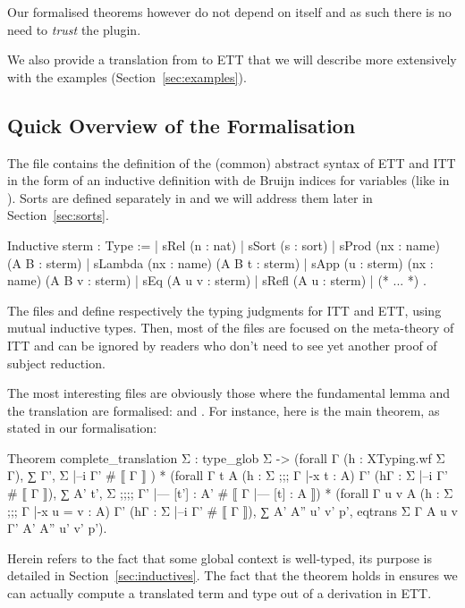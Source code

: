 Our formalised theorems however do not depend on \TemplateCoq itself and as such
there is no need to \emph{trust} the plugin.

We also provide a translation from \TemplateCoq to ETT that we will describe
more extensively with the examples (Section~\ref{sec:examples}).

\subsection{Quick Overview of the Formalisation}

The file  contains the definition of the (common) abstract syntax
of ETT and ITT in the form of an inductive definition with de Bruijn
indices for variables (like in \TemplateCoq).
Sorts are defined separately in  and we will address them later
in Section~\ref{sec:sorts}.

\begin{coq}
Inductive sterm : Type :=
| sRel (n : nat)
| sSort (s : sort)
| sProd (nx : name) (A B : sterm)
| sLambda (nx : name) (A B t : sterm)
| sApp (u : sterm) (nx : name) (A B v : sterm)
| sEq (A u v : sterm)
| sRefl (A u : sterm)
| (* ... *) .
\end{coq}

The files  and  define respectively the
typing judgments for ITT and ETT, using mutual inductive types.
Then, most of the files are focused on the meta-theory of ITT and can be ignored
by readers who don't need to see yet another proof of subject reduction.

The most interesting files are obviously those where the fundamental lemma
and the translation are formalised:  and
.
For instance, here is the main theorem, as stated in our formalisation:
%
\begin{coq}
Theorem complete_translation Σ :
  type_glob Σ ->
  (forall Γ (h : XTyping.wf Σ Γ), ∑ Γ', Σ |--i Γ' # ⟦ Γ ⟧ ) *
  (forall Γ t A (h : Σ ;;; Γ |-x t : A)
   Γ' (hΓ : Σ |--i Γ' # ⟦ Γ ⟧),
    ∑ A' t', Σ ;;;; Γ' |--- [t'] : A' # ⟦ Γ |--- [t] : A ⟧) *
  (forall Γ u v A (h : Σ ;;; Γ |-x u = v : A)
   Γ' (hΓ : Σ |--i Γ' # ⟦ Γ ⟧),
    ∑ A' A'' u' v' p', eqtrans Σ Γ A u v Γ' A' A'' u' v' p').
\end{coq}
%
Herein  refers to the fact that some global
context is well-typed, its purpose is detailed in
Section~\ref{sec:inductives}.
The fact that the theorem holds in \Coq ensures we can actually
compute a translated term and type out of a derivation in ETT.

